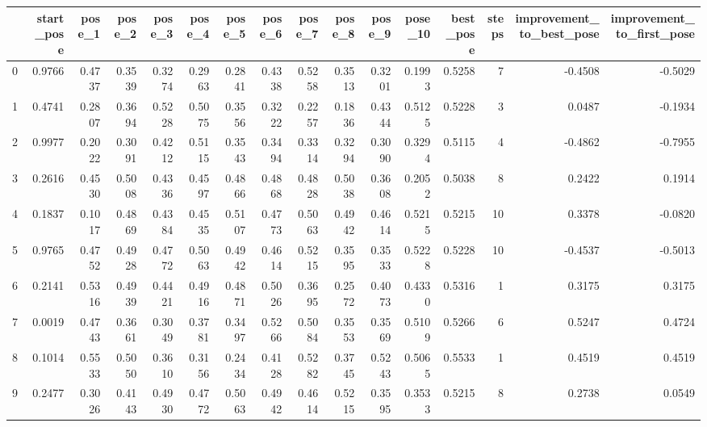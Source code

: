 \begin{tabular}{lrrrrrrrrrrrrrrr}
\toprule
{} &  start\_pose &  pose\_1 &  pose\_2 &  pose\_3 &  pose\_4 &  pose\_5 &  pose\_6 &  pose\_7 &  pose\_8 &  pose\_9 &  pose\_10 &  best\_pose &  steps &  improvement\_to\_best\_pose &  improvement\_to\_first\_pose \\
\midrule
0  &      0.9766 &  0.4737 &  0.3539 &  0.3274 &  0.2963 &  0.2841 &  0.4338 &  0.5258 &  0.3513 &  0.3201 &   0.1993 &     0.5258 &      7 &                   -0.4508 &                    -0.5029 \\
1  &      0.4741 &  0.2807 &  0.3694 &  0.5228 &  0.5075 &  0.3556 &  0.3222 &  0.2257 &  0.1836 &  0.4344 &   0.5125 &     0.5228 &      3 &                    0.0487 &                    -0.1934 \\
2  &      0.9977 &  0.2022 &  0.3091 &  0.4212 &  0.5115 &  0.3543 &  0.3494 &  0.3314 &  0.3294 &  0.3090 &   0.3294 &     0.5115 &      4 &                   -0.4862 &                    -0.7955 \\
3  &      0.2616 &  0.4530 &  0.5008 &  0.4336 &  0.4597 &  0.4866 &  0.4868 &  0.4828 &  0.5038 &  0.3608 &   0.2052 &     0.5038 &      8 &                    0.2422 &                     0.1914 \\
4  &      0.1837 &  0.1017 &  0.4869 &  0.4384 &  0.4535 &  0.5107 &  0.4773 &  0.5063 &  0.4942 &  0.4614 &   0.5215 &     0.5215 &     10 &                    0.3378 &                    -0.0820 \\
5  &      0.9765 &  0.4752 &  0.4928 &  0.4772 &  0.5063 &  0.4942 &  0.4614 &  0.5215 &  0.3595 &  0.3533 &   0.5228 &     0.5228 &     10 &                   -0.4537 &                    -0.5013 \\
6  &      0.2141 &  0.5316 &  0.4939 &  0.4421 &  0.4916 &  0.4871 &  0.5026 &  0.3695 &  0.2572 &  0.4073 &   0.4330 &     0.5316 &      1 &                    0.3175 &                     0.3175 \\
7  &      0.0019 &  0.4743 &  0.3661 &  0.3049 &  0.3781 &  0.3497 &  0.5266 &  0.5084 &  0.3553 &  0.3569 &   0.5109 &     0.5266 &      6 &                    0.5247 &                     0.4724 \\
8  &      0.1014 &  0.5533 &  0.5050 &  0.3610 &  0.3156 &  0.2434 &  0.4128 &  0.5282 &  0.3745 &  0.5243 &   0.5065 &     0.5533 &      1 &                    0.4519 &                     0.4519 \\
9  &      0.2477 &  0.3026 &  0.4143 &  0.4930 &  0.4772 &  0.5063 &  0.4942 &  0.4614 &  0.5215 &  0.3595 &   0.3533 &     0.5215 &      8 &                    0.2738 &                     0.0549 \\

\end{tabular}
